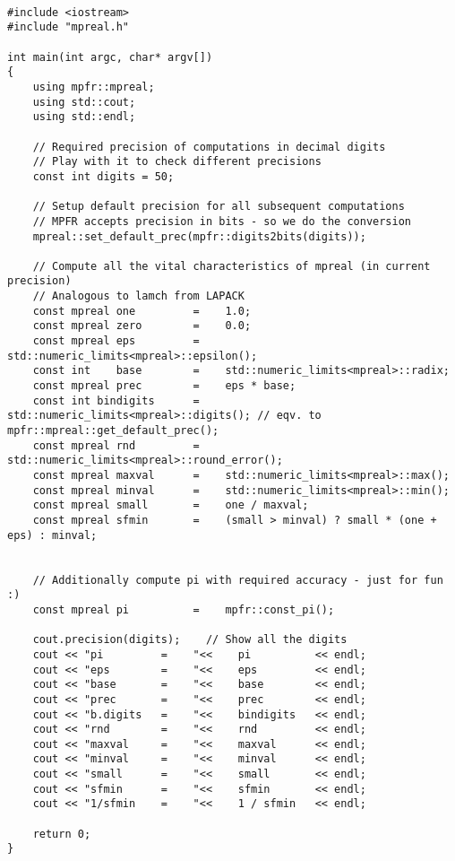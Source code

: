 \begin{lstlisting}

#include <iostream>
#include "mpreal.h"

int main(int argc, char* argv[])
{
    using mpfr::mpreal;    
    using std::cout;
    using std::endl;
    
    // Required precision of computations in decimal digits
    // Play with it to check different precisions
    const int digits = 50; 

    // Setup default precision for all subsequent computations
    // MPFR accepts precision in bits - so we do the conversion 
    mpreal::set_default_prec(mpfr::digits2bits(digits));

    // Compute all the vital characteristics of mpreal (in current precision)
    // Analogous to lamch from LAPACK
    const mpreal one         =    1.0;
    const mpreal zero        =    0.0;
    const mpreal eps         =    std::numeric_limits<mpreal>::epsilon();
    const int    base        =    std::numeric_limits<mpreal>::radix;
    const mpreal prec        =    eps * base;
    const int bindigits      =    std::numeric_limits<mpreal>::digits(); // eqv. to mpfr::mpreal::get_default_prec();
    const mpreal rnd         =    std::numeric_limits<mpreal>::round_error();
    const mpreal maxval      =    std::numeric_limits<mpreal>::max();
    const mpreal minval      =    std::numeric_limits<mpreal>::min();
    const mpreal small       =    one / maxval;
    const mpreal sfmin       =    (small > minval) ? small * (one + eps) : minval;

    
    // Additionally compute pi with required accuracy - just for fun :)
    const mpreal pi          =    mpfr::const_pi();
        
    cout.precision(digits);    // Show all the digits
    cout << "pi         =    "<<    pi          << endl;    
    cout << "eps        =    "<<    eps         << endl;
    cout << "base       =    "<<    base        << endl;
    cout << "prec       =    "<<    prec        << endl;
    cout << "b.digits   =    "<<    bindigits   << endl;
    cout << "rnd        =    "<<    rnd         << endl;
    cout << "maxval     =    "<<    maxval      << endl;    
    cout << "minval     =    "<<    minval      << endl;    
    cout << "small      =    "<<    small       << endl;    
    cout << "sfmin      =    "<<    sfmin       << endl;    
    cout << "1/sfmin    =    "<<    1 / sfmin   << endl;    
 
    return 0;
}

\end{lstlisting}








